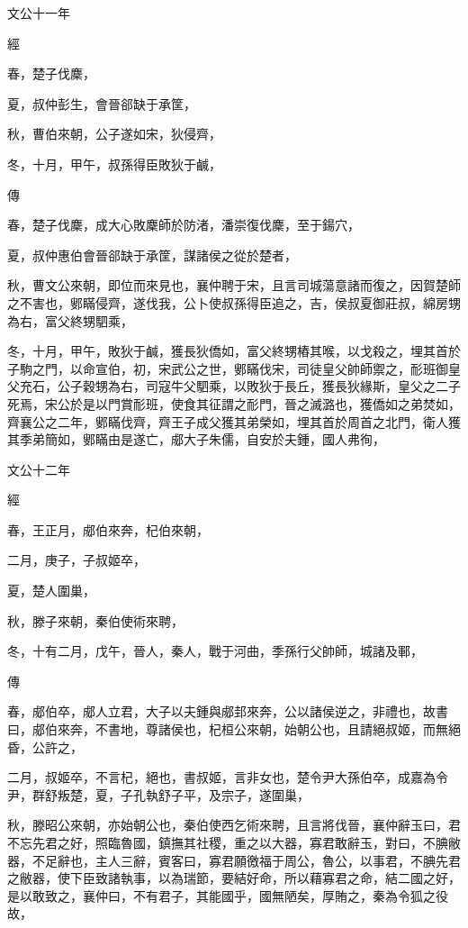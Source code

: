 \documentclass[fontset = none]{ctexart}
\begin{document}
文公十一年


經



春，楚子伐麇，

夏，叔仲彭生，會晉郤缺于承筐，

秋，曹伯來朝，公子遂如宋，狄侵齊，

冬，十月，甲午，叔孫得臣敗狄于鹹，

傳



春，楚子伐麇，成大心敗麇師於防渚，潘崇復伐麇，至于鍚穴，

夏，叔仲惠伯會晉郤缺于承筐，謀諸侯之從於楚者，

秋，曹文公來朝，即位而來見也，襄仲聘于宋，且言司城蕩意諸而復之，因賀楚師之不害也，鄋瞞侵齊，遂伐我，公卜使叔孫得臣追之，吉，侯叔夏御莊叔，綿房甥為右，富父終甥駟乘，

冬，十月，甲午，敗狄于鹹，獲長狄僑如，富父終甥樁其喉，以戈殺之，埋其首於子駒之門，以命宣伯，初，宋武公之世，鄋瞞伐宋，司徒皇父帥師禦之，耏班御皇父充石，公子穀甥為右，司寇牛父駟乘，以敗狄于長丘，獲長狄緣斯，皇父之二子死焉，宋公於是以門賞耏班，使食其征謂之耏門，晉之滅潞也，獲僑如之弟焚如，齊襄公之二年，鄋瞞伐齊，齊王子成父獲其弟榮如，埋其首於周首之北門，衛人獲其季弟簡如，鄋瞞由是遂亡，郕大子朱儒，自安於夫鍾，國人弗徇，





文公十二年


經



春，王正月，郕伯來奔，杞伯來朝，

二月，庚子，子叔姬卒，

夏，楚人圍巢，

秋，滕子來朝，秦伯使術來聘，

冬，十有二月，戊午，晉人，秦人，戰于河曲，季孫行父帥師，城諸及鄆，

傳



春，郕伯卒，郕人立君，大子以夫鍾與郕邽來奔，公以諸侯逆之，非禮也，故書曰，郕伯來奔，不書地，尊諸侯也，杞桓公來朝，始朝公也，且請絕叔姬，而無絕昏，公許之，

二月，叔姬卒，不言杞，絕也，書叔姬，言非女也，楚令尹大孫伯卒，成嘉為令尹，群舒叛楚，夏，子孔執舒子平，及宗子，遂圍巢，

秋，滕昭公來朝，亦始朝公也，秦伯使西乞術來聘，且言將伐晉，襄仲辭玉曰，君不忘先君之好，照臨魯國，鎮撫其社稷，重之以大器，寡君敢辭玉，對曰，不腆敝器，不足辭也，主人三辭，賓客曰，寡君願徼福于周公，魯公，以事君，不腆先君之敝器，使下臣致諸執事，以為瑞節，要結好命，所以藉寡君之命，結二國之好，是以敢致之，襄仲曰，不有君子，其能國乎，國無陋矣，厚賄之，秦為令狐之役故，
\end{document}
